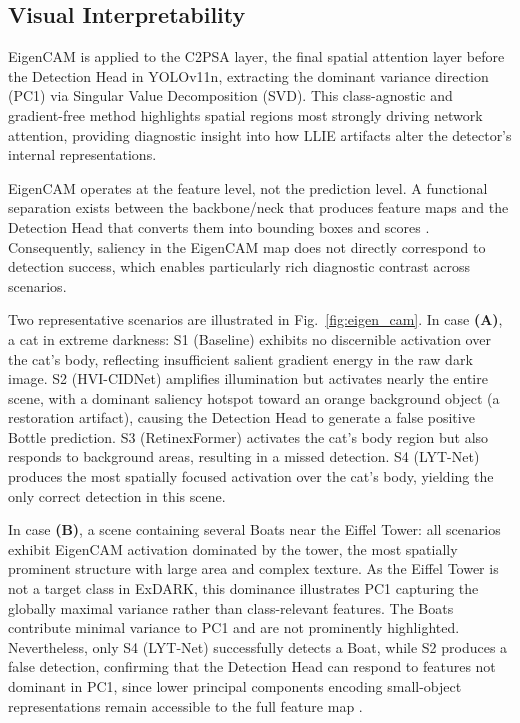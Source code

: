 \documentclass[conference]{IEEEtran}
\begin{document}

\subsection{Visual Interpretability}
EigenCAM \cite{muhammad2020eigencam} is applied to the C2PSA layer, the final spatial attention layer before the Detection Head in YOLOv11n, extracting the dominant variance direction (PC1) via Singular Value Decomposition (SVD). This class-agnostic and gradient-free method highlights spatial regions most strongly driving network attention, providing diagnostic insight into how LLIE artifacts alter the detector's internal representations.

EigenCAM operates at the feature level, not the prediction level. A functional separation exists between the backbone/neck that produces feature maps and the Detection Head that converts them into bounding boxes and scores \cite{zhou2016cam}. Consequently, saliency in the EigenCAM map does not directly correspond to detection success, which enables particularly rich diagnostic contrast across scenarios.

Two representative scenarios are illustrated in Fig.~\ref{fig:eigen_cam}. In case \textbf{(A)}, a cat in extreme darkness: S1 (Baseline) exhibits no discernible activation over the cat's body, reflecting insufficient salient gradient energy in the raw dark image. S2 (HVI-CIDNet) amplifies illumination but activates nearly the entire scene, with a dominant saliency hotspot toward an orange background object (a restoration artifact), causing the Detection Head to generate a false positive Bottle prediction. S3 (RetinexFormer) activates the cat's body region but also responds to background areas, resulting in a missed detection. S4 (LYT-Net) produces the most spatially focused activation over the cat's body, yielding the only correct detection in this scene.

In case \textbf{(B)}, a scene containing several Boats near the Eiffel Tower: all scenarios exhibit EigenCAM activation dominated by the tower, the most spatially prominent structure with large area and complex texture. As the Eiffel Tower is not a target class in ExDARK, this dominance illustrates PC1 capturing the globally maximal variance rather than class-relevant features. The Boats contribute minimal variance to PC1 and are not prominently highlighted. Nevertheless, only S4 (LYT-Net) successfully detects a Boat, while S2 produces a false detection, confirming that the Detection Head can respond to features not dominant in PC1, since lower principal components encoding small-object representations remain accessible to the full feature map \cite{zhou2016cam}.
\end{document}
